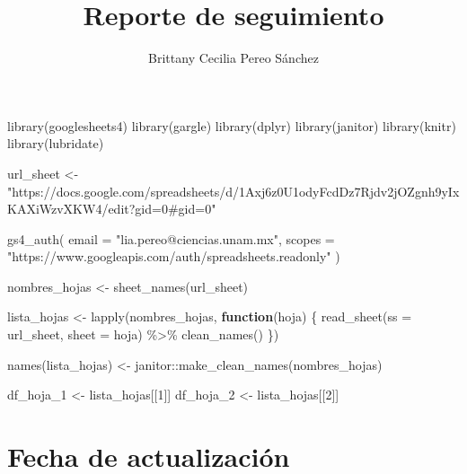 \documentclass[
]{article}
\title{Reporte de seguimiento}
\author{Brittany Cecilia Pereo Sánchez}
\date{}
\newenvironment{Shaded}{\begin{snugshade}}{\end{snugshade}}
\newcommand{\AttributeTok}[1]{\textcolor[rgb]{0.40,0.45,0.13}{#1}}
\newcommand{\ControlFlowTok}[1]{\textcolor[rgb]{0.00,0.23,0.31}{\textbf{#1}}}
\newcommand{\DecValTok}[1]{\textcolor[rgb]{0.68,0.00,0.00}{#1}}
\newcommand{\FunctionTok}[1]{\textcolor[rgb]{0.28,0.35,0.67}{#1}}
\newcommand{\NormalTok}[1]{\textcolor[rgb]{0.00,0.23,0.31}{#1}}
\newcommand{\OtherTok}[1]{\textcolor[rgb]{0.00,0.23,0.31}{#1}}
\newcommand{\SpecialCharTok}[1]{\textcolor[rgb]{0.37,0.37,0.37}{#1}}
\newcommand{\StringTok}[1]{\textcolor[rgb]{0.13,0.47,0.30}{#1}}
\renewcommand*\contentsname{Tabla de contenidos}
\newcommand\contentsname{Tabla de contenidos}
\begin{document}
\maketitle

\renewcommand*\contentsname{Tabla de contenidos}
{
\hypersetup{linkcolor=}
\setcounter{tocdepth}{3}
\tableofcontents
}

\begin{Shaded}
\begin{Highlighting}[]
\FunctionTok{library}\NormalTok{(googlesheets4)}
\FunctionTok{library}\NormalTok{(gargle)}
\FunctionTok{library}\NormalTok{(dplyr)}
\FunctionTok{library}\NormalTok{(janitor)}
\FunctionTok{library}\NormalTok{(knitr)}
\FunctionTok{library}\NormalTok{(lubridate)}

\NormalTok{url\_sheet }\OtherTok{\textless{}{-}} \StringTok{"https://docs.google.com/spreadsheets/d/1Axj6z0U1odyFcdDz7Rjdv2jOZgnh9yIxKAXiWzvXKW4/edit?gid=0\#gid=0"}

\FunctionTok{gs4\_auth}\NormalTok{(}
  \AttributeTok{email =} \StringTok{"lia.pereo@ciencias.unam.mx"}\NormalTok{,}
  \AttributeTok{scopes =} \StringTok{"https://www.googleapis.com/auth/spreadsheets.readonly"}
\NormalTok{)}

\NormalTok{nombres\_hojas }\OtherTok{\textless{}{-}} \FunctionTok{sheet\_names}\NormalTok{(url\_sheet)}

\NormalTok{lista\_hojas }\OtherTok{\textless{}{-}} \FunctionTok{lapply}\NormalTok{(nombres\_hojas, }\ControlFlowTok{function}\NormalTok{(hoja) \{}
  \FunctionTok{read\_sheet}\NormalTok{(}\AttributeTok{ss =}\NormalTok{ url\_sheet, }\AttributeTok{sheet =}\NormalTok{ hoja) }\SpecialCharTok{\%\textgreater{}\%} 
    \FunctionTok{clean\_names}\NormalTok{()}
\NormalTok{\})}

\FunctionTok{names}\NormalTok{(lista\_hojas) }\OtherTok{\textless{}{-}}\NormalTok{ janitor}\SpecialCharTok{::}\FunctionTok{make\_clean\_names}\NormalTok{(nombres\_hojas)}

\NormalTok{df\_hoja\_1 }\OtherTok{\textless{}{-}}\NormalTok{ lista\_hojas[[}\DecValTok{1}\NormalTok{]]}
\NormalTok{df\_hoja\_2 }\OtherTok{\textless{}{-}}\NormalTok{ lista\_hojas[[}\DecValTok{2}\NormalTok{]]}
\end{Highlighting}
\end{Shaded}

\section{Fecha de actualización}\label{fecha-de-actualizaciuxf3n}
\end{document}
